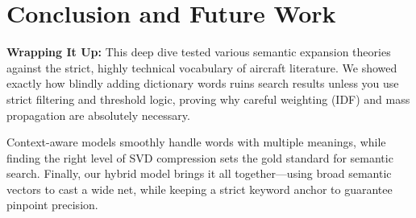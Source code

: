 \documentclass[runningheads]{llncs}
\begin{document}
\section{Conclusion and Future Work}

\textbf{Wrapping It Up:}
This deep dive tested various semantic expansion theories against the strict, highly technical vocabulary of aircraft literature. We showed exactly how blindly adding dictionary words ruins search results unless you use strict filtering and threshold logic, proving why careful weighting (IDF) and mass propagation are absolutely necessary. 

Context-aware models smoothly handle words with multiple meanings, while finding the right level of SVD compression sets the gold standard for semantic search. Finally, our hybrid model brings it all together---using broad semantic vectors to cast a wide net, while keeping a strict keyword anchor to guarantee pinpoint precision.

\begin{table}[h]
\centering
\caption{Targeted Limitations Analysis via MAP@10 Evaluation Sub-Clusters}
\label{tab:limitations_matrix}
\end{table}
\end{document}
